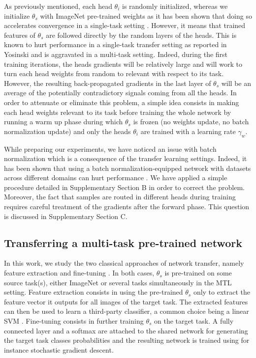 As previously mentioned, each head $\theta_i$ is randomly initialized, whereas we initialize $\theta_s$ with ImageNet pre-trained weights as it has been shown that doing so accelerates convergence in a single-task setting \parencite{mormont2018comparison}. However, it means that trained features of $\theta_s$ are followed directly by the random layers of the heads. This is known to hurt performance in a single-task transfer setting as reported in Yosinski \etal \parencite{yosinski2014transferable} and is aggravated in a multi-task setting. Indeed, during the first training iterations, the heads gradients will be relatively large and will work to turn each head weights from random to relevant with respect to its task. However, the resulting back-propagated gradients in the last layer of $\theta_s$ will be an average of the potentially contradictory signals coming from all the heads. In order to attenuate or eliminate this problem, a simple idea consists in making each head weights relevant to its task before training the whole network by running a warm up phase during which $\theta_s$ is frozen (\ie no weights update, no batch normalization update) and only the heads $\theta_i$ are trained with a learning rate $\gamma_w$. 

While preparing our experiments, we have noticed an issue with batch normalization \parencite{ioffe2015batch} which is a consequence of the transfer learning settings. Indeed, it has been shown that using a batch normalization-equipped network with datasets across different domains can hurt performance \parencite{li2018adaptive, chang2019domain}. We have applied a simple procedure detailed in Supplementary Section B in order to correct the problem. Moreover, the fact that samples are routed in different heads during training requires careful treatment of the gradients after the forward phase. This question is discussed in Supplementary Section C.

\subsection{Transferring a multi-task pre-trained network}
\label{ssec:mtask:transfer_techniques}

In this work, we study the two classical approaches of network transfer, namely feature extraction and fine-tuning \parencite{litjens2017survey}. In both cases, $\theta_s$ is pre-trained on some source task(s), either ImageNet or several tasks simultaneously in the MTL setting. Feature extraction consists in using the pre-trained $\theta_s$ only to extract the feature vector it outputs for all images of the target task. The extracted features can then be used to learn a third-party classifier, a common choice being a linear SVM \parencite{razavian2014cnn, mormont2018comparison}. Fine-tuning consists in further training $\theta_s$ on the target task. A fully connected layer and a softmax are attached to the shared network for generating the target task classes probabilities and the resulting network is trained using for instance stochastic gradient descent. 

